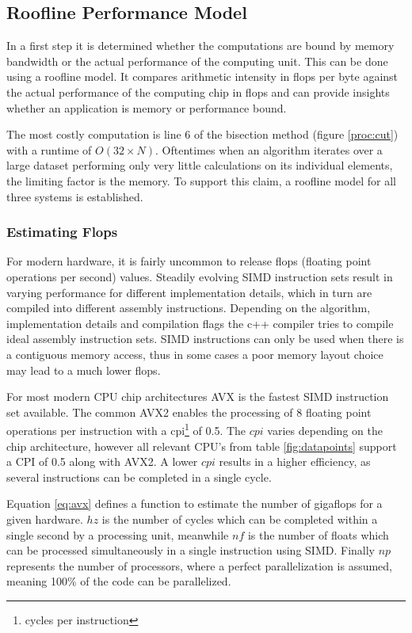 \documentclass[]{article}
\begin{document}
\subsection{Roofline Performance Model} \label{sec:roof}

In a first step it is determined whether the computations are bound by memory bandwidth or the actual performance of the computing unit. This can be done using a roofline model. It compares arithmetic intensity in flops per byte against the actual performance of the computing chip in flops and can provide insights whether an application is memory or performance bound. 

The most costly computation is line 6 of the bisection method (figure \ref{proc:cut}) with a runtime of $O(32 \times N)$. Oftentimes when an algorithm iterates over a large dataset performing only very little calculations on its individual elements, the limiting factor is the memory. To support this claim, a roofline model for all three systems is established. 

\subsubsection{Estimating Flops}

For modern hardware, it is fairly uncommon to release flops (floating point operations per second) values. Steadily evolving SIMD instruction sets result in varying performance for different implementation details, which in turn are compiled into different assembly instructions. Depending on the algorithm, implementation details and compilation flags the c++ compiler tries to compile ideal assembly instruction sets. SIMD instructions can only be used when there is a contiguous memory access, thus in some cases a poor memory layout choice may lead to a much lower flops. 

For most modern CPU chip architectures AVX is the fastest SIMD instruction set available. The common AVX2 enables the processing of 8 floating point operations per instruction with a cpi\footnote{cycles per instruction} of 0.5. The $cpi$ varies depending on the chip architecture, however all relevant CPU's from table \ref{fig:datapoints} support a CPI of 0.5 along with AVX2. A lower $cpi$ results in a higher efficiency, as several instructions can be completed in a single cycle. 

Equation \ref{eq:avx} defines a function to estimate the number of gigaflops for a given hardware. $hz$ is the number of cycles which can be completed within a single second by a processing unit, meanwhile $nf$ is the number of floats which can be processed simultaneously in a single instruction using SIMD. Finally $np$ represents the number of processors, where a perfect parallelization is assumed, meaning 100\% of the code can be parallelized.
\end{document}
